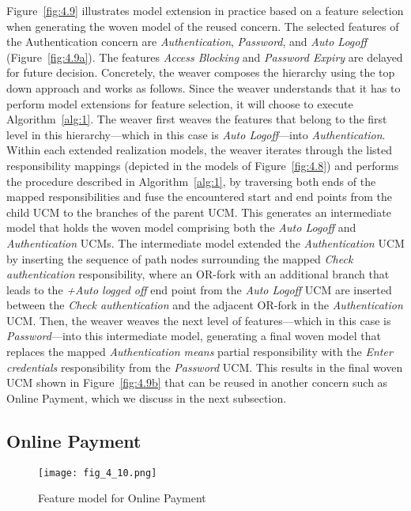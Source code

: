 Figure~\ref{fig:4.9} illustrates model extension in practice based on a feature selection when generating the woven model of the reused concern. The selected features of the Authentication concern are \emph{Authentication}, \emph{Password}, and \emph{Auto Logoff} (Figure~\ref{fig:4.9a}). The features \emph{Access Blocking} and \emph{Password Expiry} are delayed for future decision. Concretely, the weaver composes the hierarchy using the top down approach and works as follows. Since the weaver understands that it has to perform model extensions for feature selection, it will choose to execute Algorithm~\ref{alg:1}. The weaver first weaves the features that belong to the first level in this hierarchy---which in this case is \emph{Auto Logoff}---into \emph{Authentication}. Within each extended realization models, the weaver iterates through the listed responsibility mappings (depicted in the models of Figure~\ref{fig:4.8}) and performs the procedure described in Algorithm~\ref{alg:1}, by traversing both ends of the mapped responsibilities and fuse the encountered start and end points from the child UCM to the branches of the parent UCM. This generates an intermediate model that holds the woven model comprising both the \emph{Auto Logoff} and \emph{Authentication} UCMs. The intermediate model extended the \emph{Authentication} UCM by inserting the sequence of path nodes surrounding the mapped \emph{Check authentication} responsibility, where an OR-fork with an additional branch that leads to the \emph{+Auto logged off} end point from the \emph{Auto Logoff} UCM are inserted between the \emph{Check authentication} and the adjacent OR-fork in the \emph{Authentication} UCM. Then, the weaver weaves the next level of features---which in this case is \emph{Password}---into this intermediate model, generating a final woven model that replaces the mapped \emph{Authentication means} partial responsibility with the \emph{Enter credentials} responsibility from the \emph{Password} UCM. This results in the final woven UCM shown in Figure~\ref{fig:4.9b} that can be reused in another concern such as Online Payment, which we discuss in the next subsection.

\subsection{Online Payment}

\begin{figure}[h]
	\centering
	\texttt{[image: fig\_4\_10.png]}
	\caption{Feature model for Online Payment}
	\label{fig:4.10}
\end{figure}

